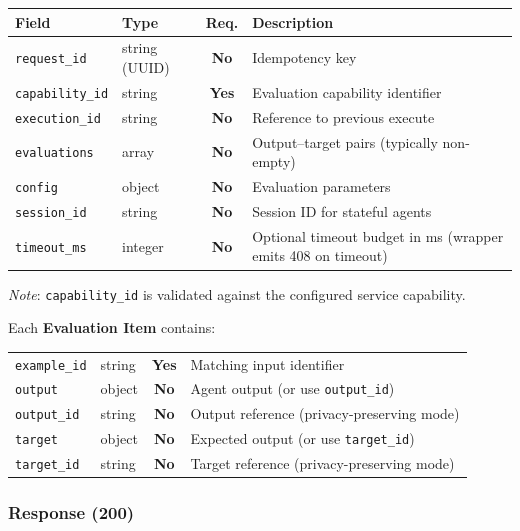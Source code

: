 \documentclass[11pt,a4paper]{article}
\newcommand{\field}[1]{\texttt{#1}}
\newcommand{\required}{\textbf{Yes}}
\newcommand{\optional}{\textbf{No}}
\begin{document}
\begin{center}\small
\begin{tabularx}{\textwidth}{@{}llcX@{}}
\toprule
\textbf{Field} & \textbf{Type} & \textbf{Req.} & \textbf{Description} \\
\midrule
\field{request\_id}    & string (UUID) & \optional & Idempotency key \\
\field{capability\_id} & string        & \required & Evaluation capability identifier \\
\field{execution\_id}  & string        & \optional & Reference to previous execute \\
\field{evaluations}    & array         & \optional & Output--target pairs (typically non-empty) \\
\field{config}         & object        & \optional & Evaluation parameters \\
\field{session\_id}    & string        & \optional & Session ID for stateful agents \\
\field{timeout\_ms}    & integer       & \optional & Optional timeout budget in ms (wrapper emits 408 on timeout) \\
\bottomrule
\end{tabularx}
\end{center}

\textit{Note}: \field{capability\_id} is validated against the configured service capability.

Each \textbf{Evaluation Item} contains:

\begin{center}\small
\begin{tabularx}{\textwidth}{@{}llcX@{}}
\toprule
\field{example\_id}   & string & \required & Matching input identifier \\
\field{output}      & object & \optional & Agent output (or use \field{output\_id}) \\
\field{output\_id}  & string & \optional & Output reference (privacy-preserving mode) \\
\field{target}      & object & \optional & Expected output (or use \field{target\_id}) \\
\field{target\_id}  & string & \optional & Target reference (privacy-preserving mode) \\
\bottomrule
\end{tabularx}
\end{center}

\subsubsection{Response (200)}
\end{document}
